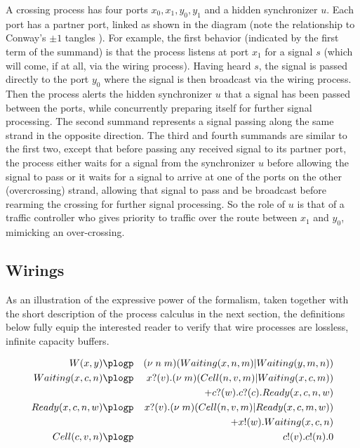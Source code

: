 A crossing process has four ports $x_0,x_1,y_0,y_1$ and a hidden
synchronizer $u$. Each port has a partner port, linked as shown in the
diagram (note the relationship to Conway's $\pm 1$ tangles
\cite{Conway1970An-enumeration-}). For example, the first behavior (indicated by the first
term of the summand) is that the process listens at port $x_1$ for a
signal $s$ (which will come, if at all, via the wiring
process). Having heard $s$, the signal is passed directly to the port
$y_0$ where the signal is then broadcast via the wiring process. Then
the process alerts the hidden synchronizer $u$ that a signal has been
passed between the ports, while concurrently preparing itself for
further signal processing. The second summand represents a signal
passing along the same strand in the opposite direction. The third and
fourth summands are similar to the first two, except that before
passing any received signal to its partner port, the process either waits for
a signal from the synchronizer $u$ before allowing the signal to
pass or it waits for a signal to arrive at one of the ports on the other (overcrossing) strand, allowing that signal to pass and be broadcast before rearming the crossing for further signal processing. So the role of $u$ is that of a traffic controller who gives
priority to traffic over the route between $x_1$ and $y_0$, mimicking
an over-crossing.

\subsection{Wirings}\label{sub:wirings} %

As an illustration of the expressive power of the formalism, taken
together with the short description of the process calculus in the next
section, the definitions below fully equip the interested reader to
verify that wire processes are lossless, infinite capacity buffers. 


\begin{eqnarray*}
    W(x,y) & \plogp & (\nu \; n \; m)(Waiting(x,n,m) | Waiting(y,m,n)) \nonumber \\
Waiting(x,c,n) & \plogp   & x?(v).(\nu \; m)(Cell(n,v,m) | Waiting(x,c,m)) \nonumber \\
  & & + c?(w).c?(c).Ready(x,c,n,w) \nonumber \\
  Ready(x,c,n,w) & \plogp  & x?(v).(\nu \; m)(Cell(n,v,m) | Ready(x,c,m,w)) \nonumber \\
  & & + x!(w).Waiting(x,c,n) \nonumber \\
  Cell(c,v,n) & \plogp & c!(v).c!(n).0 \nonumber
\end{eqnarray*}

